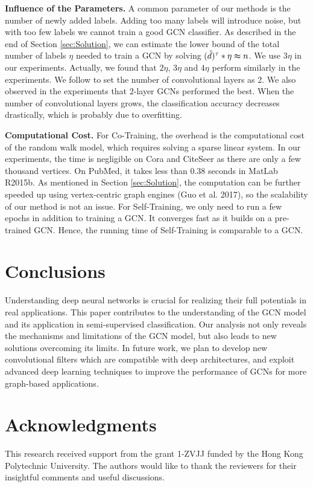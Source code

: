 \documentclass[letterpaper]{article} \usepackage{aaai18}  \usepackage{times}  \usepackage{helvet}  \usepackage{courier}  \usepackage{url}  \usepackage{graphicx}  \usepackage{algorithm}
\begin{document}
\textbf{Influence of the Parameters.} A common parameter of our methods is the number of newly added labels. Adding too many labels will introduce noise, but with too few labels we cannot train a good GCN classifier. As described in the end of Section \ref{sec:Solution}, we can estimate the lower bound of the total number of labels $\eta$ needed to train a GCN by solving $(\hat{d})^\tau*\eta\thickapprox n$. We use $3\eta$ in our experiments. Actually, we found that $2\eta$, $3\eta$ and $4\eta$ perform similarly in the experiments. We follow \citeauthor{kipf2016semi} to set the number of convolutional layers as 2. We also observed in the experiments that 2-layer GCNs performed the best. When the number of convolutional layers grows, the classification accuracy decreases drastically, which is probably due to overfitting.

\textbf{Computational Cost.} For Co-Training, the overhead is the computational cost of the random walk model, which requires solving a sparse linear system. In our experiments, the time is negligible on Cora and CiteSeer as there are only a few thousand vertices. On PubMed, it takes less than 0.38 seconds in MatLab R2015b. As mentioned in Section \ref{sec:Solution}, the computation can be further speeded up using vertex-centric graph engines (Guo et al. 2017), so the scalability of our method is not an issue. For Self-Training, we only need to run a few epochs in addition to training a GCN. It converges fast as it builds on a pre-trained GCN. Hence, the running time of Self-Training is comparable to a GCN.



















\section{Conclusions}\label{sec:conclusion}

Understanding deep neural networks is crucial for realizing their full potentials in real applications. This paper contributes to the understanding of the GCN model and its application in semi-supervised classification. Our analysis not only reveals the mechanisms and limitations of the GCN model, but also leads to new solutions overcoming its limits. In future work, we plan to develop new convolutional filters which are compatible with deep architectures, and exploit advanced deep learning techniques to improve the performance of GCNs for more graph-based applications.

\section*{Acknowledgments}

This research received support from the grant 1-ZVJJ funded by the Hong Kong Polytechnic University. The authors would like to thank the reviewers for their insightful comments and useful discussions.













\end{document}
